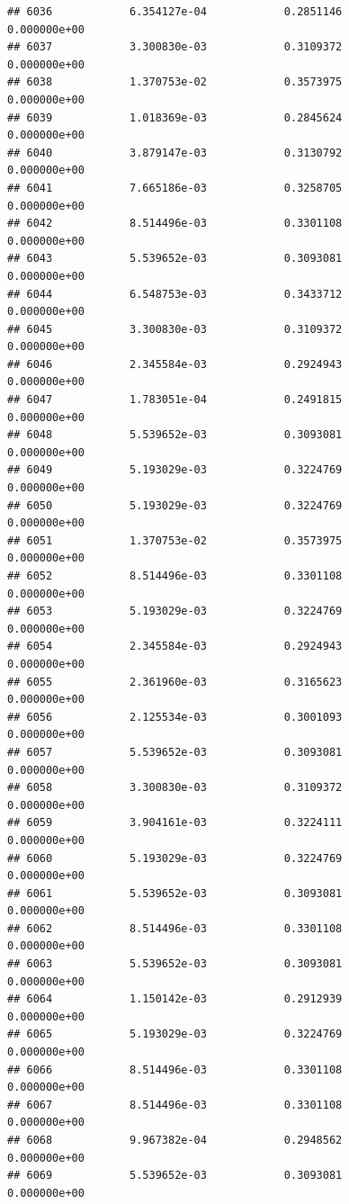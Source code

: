 \documentclass[
]{article}
\begin{document}
\begin{verbatim}
## 6036            6.354127e-04            0.2851146            0.000000e+00
## 6037            3.300830e-03            0.3109372            0.000000e+00
## 6038            1.370753e-02            0.3573975            0.000000e+00
## 6039            1.018369e-03            0.2845624            0.000000e+00
## 6040            3.879147e-03            0.3130792            0.000000e+00
## 6041            7.665186e-03            0.3258705            0.000000e+00
## 6042            8.514496e-03            0.3301108            0.000000e+00
## 6043            5.539652e-03            0.3093081            0.000000e+00
## 6044            6.548753e-03            0.3433712            0.000000e+00
## 6045            3.300830e-03            0.3109372            0.000000e+00
## 6046            2.345584e-03            0.2924943            0.000000e+00
## 6047            1.783051e-04            0.2491815            0.000000e+00
## 6048            5.539652e-03            0.3093081            0.000000e+00
## 6049            5.193029e-03            0.3224769            0.000000e+00
## 6050            5.193029e-03            0.3224769            0.000000e+00
## 6051            1.370753e-02            0.3573975            0.000000e+00
## 6052            8.514496e-03            0.3301108            0.000000e+00
## 6053            5.193029e-03            0.3224769            0.000000e+00
## 6054            2.345584e-03            0.2924943            0.000000e+00
## 6055            2.361960e-03            0.3165623            0.000000e+00
## 6056            2.125534e-03            0.3001093            0.000000e+00
## 6057            5.539652e-03            0.3093081            0.000000e+00
## 6058            3.300830e-03            0.3109372            0.000000e+00
## 6059            3.904161e-03            0.3224111            0.000000e+00
## 6060            5.193029e-03            0.3224769            0.000000e+00
## 6061            5.539652e-03            0.3093081            0.000000e+00
## 6062            8.514496e-03            0.3301108            0.000000e+00
## 6063            5.539652e-03            0.3093081            0.000000e+00
## 6064            1.150142e-03            0.2912939            0.000000e+00
## 6065            5.193029e-03            0.3224769            0.000000e+00
## 6066            8.514496e-03            0.3301108            0.000000e+00
## 6067            8.514496e-03            0.3301108            0.000000e+00
## 6068            9.967382e-04            0.2948562            0.000000e+00
## 6069            5.539652e-03            0.3093081            0.000000e+00

\end{verbatim}
\end{document}
